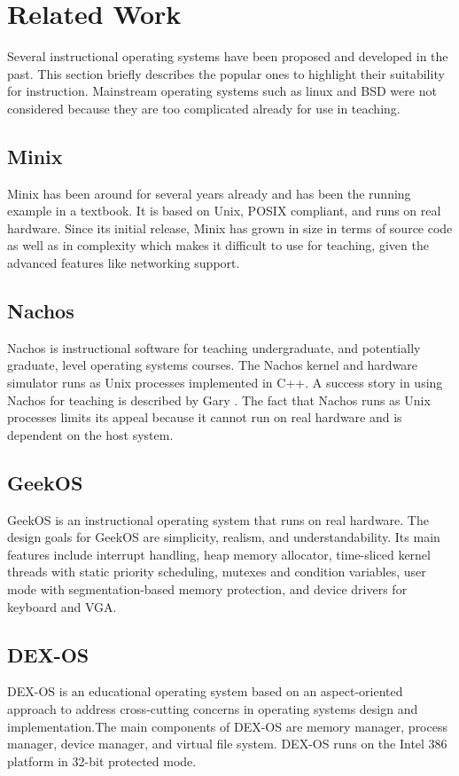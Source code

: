 \documentclass{acm_proc_article-sp}
\begin{document}
\section{Related Work}
Several instructional operating systems have been proposed and developed in 
the past\cite{anderson:survey}. This section briefly describes the popular ones to highlight their suitability for instruction. Mainstream operating systems 
such as linux and BSD were not considered because they are too complicated 
already for use in teaching.

\subsection{Minix}
Minix\cite{tanenbaum:minix} has been around for several years already and has 
been the running example in a textbook\cite{tanenbaum:osdai}. It is based
on Unix, POSIX compliant, and runs on real hardware. Since its initial release,
Minix has grown in size in terms of source code as well as in complexity 
which makes it difficult to use for teaching, given the advanced features like 
networking support.

\subsection{Nachos}
Nachos\cite{christopher:nachos} is instructional software for teaching 
undergraduate, and potentially graduate, level operating systems courses.
The Nachos kernel and hardware simulator runs as Unix processes implemented
in C++. A success story in using Nachos for teaching is described by Gary
\cite{gary:nachos}. The fact that Nachos runs as Unix processes limits 
its appeal because it cannot run on real hardware and is dependent on the
host system.

\subsection{GeekOS}
GeekOS\cite{hovemeyer:geekos} is an instructional operating system that
runs on real hardware. The design goals for GeekOS are simplicity, realism,
and understandability. Its main features include interrupt handling, 
heap memory allocator, time-sliced kernel threads with static priority
scheduling, mutexes and condition variables, user mode with segmentation-based
memory protection, and device drivers for keyboard and VGA.


\subsection{DEX-OS}
DEX-OS\cite{dayo:dexos,dexos:site} is an educational operating system based on
an aspect-oriented approach to address cross-cutting concerns in operating 
systems design and implementation.The main components of DEX-OS are memory 
manager, process manager, device manager, and virtual file system. DEX-OS runs
on the Intel 386 platform in 32-bit protected mode.
\end{document}
